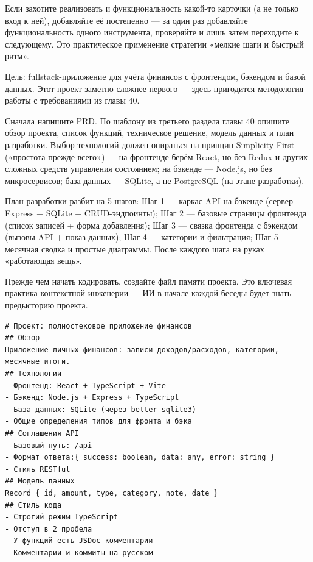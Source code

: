 Если захотите реализовать и функциональность какой-то карточки (а не только вход к ней), добавляйте её постепенно — за один раз добавляйте функциональность одного инструмента, проверяйте и лишь затем переходите к следующему. Это практическое применение стратегии «мелкие шаги и быстрый ритм».



Цель: fullstack-приложение для учёта финансов с фронтендом, бэкендом и базой данных. Этот проект заметно сложнее первого — здесь пригодится методология работы с требованиями из главы 40.

Сначала напишите PRD. По шаблону из третьего раздела главы 40 опишите обзор проекта, список функций, техническое решение, модель данных и план разработки. Выбор технологий должен опираться на принцип Simplicity First («простота прежде всего») — на фронтенде берём React, но без Redux и других сложных средств управления состоянием; на бэкенде — Node.js, но без микросервисов; база данных — SQLite, а не PostgreSQL (на этапе разработки).

План разработки разбит на 5 шагов: Шаг 1 — каркас API на бэкенде (сервер Express + SQLite + CRUD-эндпоинты); Шаг 2 — базовые страницы фронтенда (список записей + форма добавления); Шаг 3 — связка фронтенда с бэкендом (вызовы API + показ данных); Шаг 4 — категории и фильтрация; Шаг 5 — месячная сводка и простые диаграммы. После каждого шага на руках «работающая вещь».


Прежде чем начать кодировать, создайте файл памяти проекта. Это ключевая практика контекстной инженерии — ИИ в начале каждой беседы будет знать предысторию проекта.

\begin{lstlisting}
# Проект: полностековое приложение финансов
## Обзор
Приложение личных финансов: записи доходов/расходов, категории, месячные итоги.
## Технологии
- Фронтенд: React + TypeScript + Vite
- Бэкенд: Node.js + Express + TypeScript
- База данных: SQLite (через better-sqlite3)
- Общие определения типов для фронта и бэка
## Соглашения API
- Базовый путь: /api
- Формат ответа:{ success: boolean, data: any, error: string }
- Стиль RESTful
## Модель данных
Record { id, amount, type, category, note, date }
## Стиль кода
- Строгий режим TypeScript
- Отступ в 2 пробела
- У функций есть JSDoc-комментарии
- Комментарии и коммиты на русском
\end{lstlisting}

